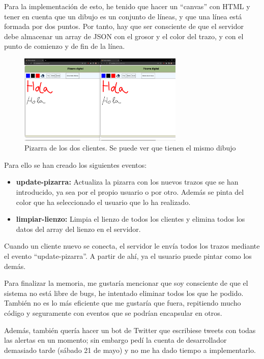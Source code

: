 \documentclass{article}
\begin{document}
\bigskip

Para la implementación de esto, he tenido que hacer un ``canvas'' con HTML y tener en cuenta que un dibujo es un conjunto de líneas, y que una línea está formada por dos puntos. Por tanto, hay que ser consciente de que el servidor debe almacenar un array de JSON con el grosor y el color del trazo, y con el punto de comienzo y de fin de la línea.

\begin{figure}[H]
    \centering
    \includegraphics[width=0.7\textwidth]{images/pizarra.png}
    \caption{Pizarra de los dos clientes. Se puede ver que tienen el mismo dibujo}
\end{figure}

\newpage

Para ello se han creado los siguientes eventos:

\begin{itemize}
    \item \textbf{update-pizarra: }Actualiza la pizarra con los nuevos trazos que se han introducido, ya sea por el propio usuario o por otro. Además se pinta del color que ha seleccionado el usuario que lo ha realizado.
    \item \textbf{limpiar-lienzo: }Limpia el lienzo de todos los clientes y elimina todos los datos del array del lienzo en el servidor.
\end{itemize}

Cuando un cliente nuevo se conecta, el servidor le envía todos los trazos mediante el evento ``update-pizarra''. A partir de ahí, ya el usuario puede pintar como los demás.


Para finalizar la memoria, me gustaría mencionar que soy consciente de que el sistema no está libre de bugs, he intentado eliminar todos los que he podido. También no es lo más eficiente que me gustaría que fuera, repitiendo mucho código y seguramente con eventos que se podrían encapsular en otros.

Además, también quería hacer un bot de Twitter que escribiese tweets con todas las alertas en un momento; sin embargo pedí la cuenta de desarrollador demasiado tarde (sábado 21 de mayo) y no me ha dado tiempo a implementarlo.
\end{document}
